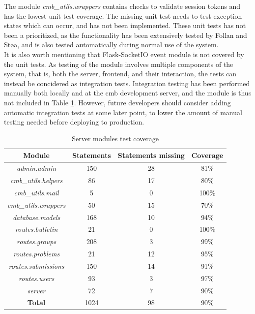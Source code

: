 The module \textit{cmb\_utils.wrappers} contains checks to validate session tokens and has the lowest unit test coverage. The missing unit test needs to test exception states which can occur, and has not been implemented. These unit tests has not been a prioritized, as the functionality has been extensively tested by Follan and Støa, and is also tested automatically during normal use of the system. \\

It is also worth mentioning that Flask-SocketIO event module is not covered by the unit tests. As testing of the module involves multiple components of the system, that is, both the server, frontend, and their interaction, the tests can instead be concidered as integration tests. Integration testing has been performed manually both locally and at the \gls{cmb} development server, and the module is thus not included in Table \ref{tab:server-module-coverage}. However, future developers should consider adding automatic integration tests at some later point, to lower the amount of manual testing needed before deploying to production.

\begin{table}[h!]
    \centering
    \begin{tabular}{c c c c}
      \hline
      \textbf{Module} & \textbf{Statements} & \textbf{Statements missing} & \textbf{Coverage} \\ \hline
      \textit{admin.admin} & 150 & 28 & 81\% \\
      \textit{cmb\_utils.helpers} & 86 & 17 & 80\% \\
      \textit{cmb\_utils.mail} & 5 & 0 & 100\% \\
      \textit{cmb\_utils.wrappers} & 50 & 15 & 70\% \\
      \textit{database.models} & 168 & 10 & 94\% \\
      \textit{routes.bulletin} & 21 & 0 & 100\% \\
      \textit{routes.groups} & 208 & 3 & 99\% \\
      \textit{routes.problems} & 21 & 12 & 95\% \\
      \textit{routes.submissions} & 150 & 14 & 91\% \\
      \textit{routes.users} & 93 & 3 & 97\% \\
      \textit{server} & 72 & 7 & 90\% \\ \hline
      \textbf{Total} & 1024 & 98 & 90\% \\ \hline
    \end{tabular}
    \caption{Server modules test coverage}
    \label{tab:server-module-coverage}
\end{table}
